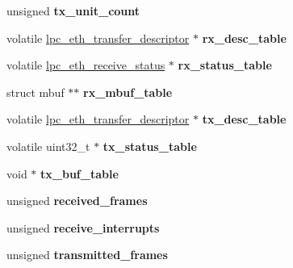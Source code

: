 \begin{DoxyCompactItemize}
unsigned {\bfseries tx\+\_\+unit\+\_\+count}
\item 
\mbox{\label{structlpc__eth__driver__entry_ab56d43b5a8d50bd4af195ab308c52cac}} 
volatile \mbox{\hyperlink{structlpc__eth__transfer__descriptor}{lpc\+\_\+eth\+\_\+transfer\+\_\+descriptor}} $\ast$ {\bfseries rx\+\_\+desc\+\_\+table}
\item 
\mbox{\label{structlpc__eth__driver__entry_ad1128dea73a87ac208d24a071d761313}} 
volatile \mbox{\hyperlink{structlpc__eth__receive__status}{lpc\+\_\+eth\+\_\+receive\+\_\+status}} $\ast$ {\bfseries rx\+\_\+status\+\_\+table}
\item 
\mbox{\label{structlpc__eth__driver__entry_a656bde0ea69191a1283a861dd8bc35bb}} 
struct mbuf $\ast$$\ast$ {\bfseries rx\+\_\+mbuf\+\_\+table}
\item 
\mbox{\label{structlpc__eth__driver__entry_a0a0eac1b4abc861048825af720602790}} 
volatile \mbox{\hyperlink{structlpc__eth__transfer__descriptor}{lpc\+\_\+eth\+\_\+transfer\+\_\+descriptor}} $\ast$ {\bfseries tx\+\_\+desc\+\_\+table}
\item 
\mbox{\label{structlpc__eth__driver__entry_a692ee14c26df72d155c0710383fd7a00}} 
volatile uint32\+\_\+t $\ast$ {\bfseries tx\+\_\+status\+\_\+table}
\item 
\mbox{\label{structlpc__eth__driver__entry_aab05ffba427f99a83649282923ac4dc8}} 
void $\ast$ {\bfseries tx\+\_\+buf\+\_\+table}
\item 
\mbox{\label{structlpc__eth__driver__entry_a9f27e9109a17c90f314e084970f871c0}} 
unsigned {\bfseries received\+\_\+frames}
\item 
\mbox{\label{structlpc__eth__driver__entry_a30a39019fb184fe04553803915e5793c}} 
unsigned {\bfseries receive\+\_\+interrupts}
\item 
\mbox{\label{structlpc__eth__driver__entry_ab783c63f2795d6982d40855c87418b06}} 
unsigned {\bfseries transmitted\+\_\+frames}
$$
\end{DoxyCompactItemize}

